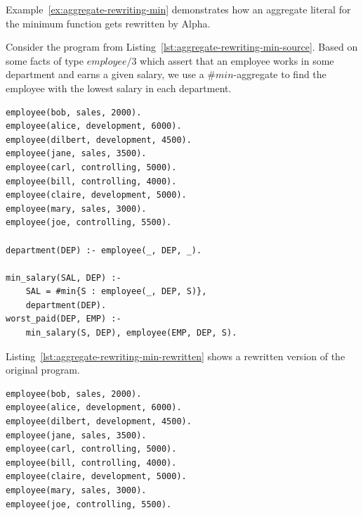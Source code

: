 Example~\ref{ex:aggregate-rewriting-min} demonstrates how an aggregate literal for the minimum function gets rewritten by Alpha.

\begin{example}
\label{ex:aggregate-rewriting-min}
Consider the program from Listing~\ref{lst:aggregate-rewriting-min-source}. Based on some facts of type $employee/3$ which assert that an employee works in some department and earns a given salary, we use a $\#min$-aggregate to find the employee with the lowest salary in each department.
\begin{lstlisting}[style=asp-code, label={lst:aggregate-rewriting-min-source}, caption={ASP program to find the worst paid employee per department.}]
employee(bob, sales, 2000).
employee(alice, development, 6000).
employee(dilbert, development, 4500).
employee(jane, sales, 3500).
employee(carl, controlling, 5000).
employee(bill, controlling, 4000).
employee(claire, development, 5000).
employee(mary, sales, 3000).
employee(joe, controlling, 5500).
    
department(DEP) :- employee(_, DEP, _).
    
min_salary(SAL, DEP) :- 
    SAL = #min{S : employee(_, DEP, S)}, 
    department(DEP).
worst_paid(DEP, EMP) :- 
    min_salary(S, DEP), employee(EMP, DEP, S).    
\end{lstlisting} 
Listing~\ref{lst:aggregate-rewriting-min-rewritten} shows a rewritten version of the original program.
\begin{lstlisting}[style=asp-code, label={lst:aggregate-rewriting-min-rewritten}, caption={The program from Listing~\ref{lst:aggregate-rewriting-min-source} in its rewritten version.}]
employee(bob, sales, 2000).
employee(alice, development, 6000).
employee(dilbert, development, 4500).
employee(jane, sales, 3500).
employee(carl, controlling, 5000).
employee(bill, controlling, 4000).
employee(claire, development, 5000).
employee(mary, sales, 3000).
employee(joe, controlling, 5500).


\end{lstlisting}
\end{example}
